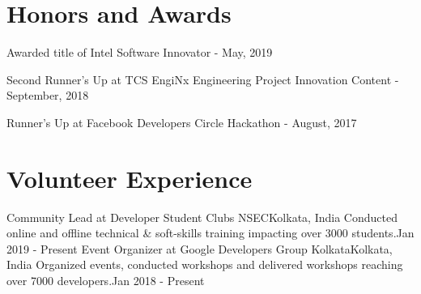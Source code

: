 \section{Honors and Awards}
\begin{description}[font=$\bullet$]
\item {Awarded title of Intel Software Innovator - May, 2019}
\vspace{-5pt}
\item {Second Runner's Up at TCS EngiNx Engineering Project Innovation Content - September, 2018 }
\vspace{-5pt}
\item {Runner's Up at Facebook Developers Circle Hackathon - August, 2017}

\end{description}

\vspace{-5pt}
\section{Volunteer Experience}
  \resumeSubHeadingListStart
	\resumeSubheading
    {Community Lead at Developer Student Clubs NSEC}{Kolkata, India}
    {Conducted online and offline technical \& soft-skills training impacting over 3000 students.}{Jan 2019 - Present}
\vspace{5pt}
    \resumeSubheading
    {Event Organizer at Google Developers Group Kolkata}{Kolkata, India}
    {Organized events, conducted workshops and delivered workshops reaching over 7000 developers.}{Jan 2018 - Present}

\resumeSubHeadingListEnd



